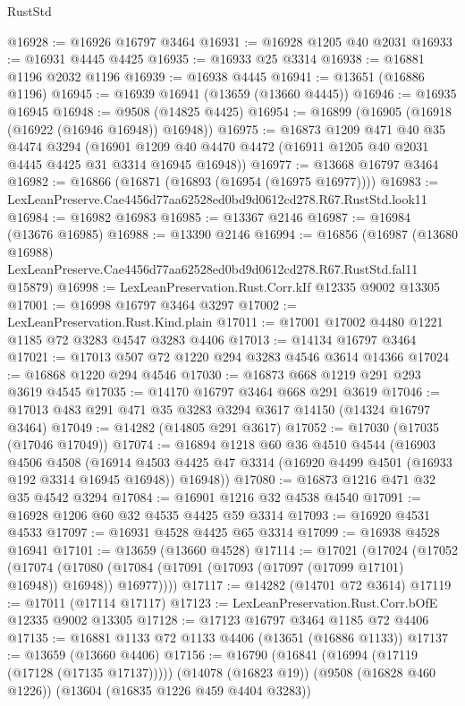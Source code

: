 \begin{lexlean}{RustStd}
\begin{coremodule}
@16928 := @16926 @16797 @3464
@16931 := @16928 @1205 @40 @2031
@16933 := @16931 @4445 @4425
@16935 := @16933 @25 @3314
@16938 := @16881 @1196 @2032 @1196
@16939 := @16938 @4445
@16941 := @13651 (@16886 @1196)
@16945 := @16939 @16941 (@13659 (@13660 @4445))
@16946 := @16935 @16945
@16948 := @9508 (@14825 @4425)
@16954 := @16899 (@16905 (@16918 (@16922 (@16946 @16948)) @16948))
@16975 := @16873
    @1209
    @471
    @40
    @35
    @4474
    @3294
    (@16901 @1209 @40 @4470 @4472 (@16911 @1205 @40 @2031 @4445 @4425 @31 @3314 @16945 @16948))
@16977 := @13668 @16797 @3464
@16982 := @16866 (@16871 (@16893 (@16954 (@16975 @16977))))
@16983 := LexLeanPreserve.Cae4456d77aa62528ed0bd9d0612cd278.R67.RustStd.look11
@16984 := @16982 @16983
@16985 := @13367 @2146
@16987 := @16984 (@13676 @16985)
@16988 := @13390 @2146
@16994 := @16856
    (@16987
      (@13680 @16988)
      LexLeanPreserve.Cae4456d77aa62528ed0bd9d0612cd278.R67.RustStd.fal11
      @15879)
@16998 := LexLeanPreservation.Rust.Corr.kIf @12335 @9002 @13305
@17001 := @16998 @16797 @3464 @3297
@17002 := LexLeanPreservation.Rust.Kind.plain
@17011 := @17001 @17002 @4480 @1221 @1185 @72 @3283 @4547 @3283 @4406
@17013 := @14134 @16797 @3464
@17021 := @17013 @507 @72 @1220 @294 @3283 @4546 @3614 @14366
@17024 := @16868 @1220 @294 @4546
@17030 := @16873 @668 @1219 @291 @293 @3619 @4545
@17035 := @14170 @16797 @3464 @668 @291 @3619
@17046 := @17013 @483 @291 @471 @35 @3283 @3294 @3617 @14150 (@14324 @16797 @3464)
@17049 := @14282 (@14805 @291 @3617)
@17052 := @17030 (@17035 (@17046 @17049))
@17074 := @16894
    @1218
    @60
    @36
    @4510
    @4544
    (@16903
      @4506
      @4508
      (@16914 @4503 @4425 @47 @3314 (@16920 @4499 @4501 (@16933 @192 @3314 @16945 @16948)) @16948))
@17080 := @16873 @1216 @471 @32 @35 @4542 @3294
@17084 := @16901 @1216 @32 @4538 @4540
@17091 := @16928 @1206 @60 @32 @4535 @4425 @59 @3314
@17093 := @16920 @4531 @4533
@17097 := @16931 @4528 @4425 @65 @3314
@17099 := @16938 @4528 @16941
@17101 := @13659 (@13660 @4528)
@17114 := @17021
    (@17024
      (@17052
        (@17074 (@17080 (@17084 (@17091 (@17093 (@17097 (@17099 @17101) @16948)) @16948)) @16977))))
@17117 := @14282 (@14701 @72 @3614)
@17119 := @17011 (@17114 @17117)
@17123 := LexLeanPreservation.Rust.Corr.bOfE @12335 @9002 @13305
@17128 := @17123 @16797 @3464 @1185 @72 @4406
@17135 := @16881 @1133 @72 @1133 @4406 (@13651 (@16886 @1133))
@17137 := @13659 (@13660 @4406)
@17156 := @16790
    (@16841 (@16994 (@17119 (@17128 (@17135 @17137)))))
    (@14078 (@16823 @19))
    (@9508 (@16828 @460 @1226))
    (@13604 (@16835 @1226 @459 @4404 @3283))

\end{coremodule}
\end{lexlean}
